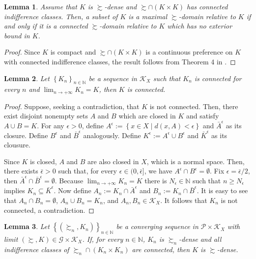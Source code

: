 \documentclass[12pt, oneside]{amsart}
\newtheorem{lemma}{Lemma}
\theoremstyle{definition}
\begin{document}
\begin{lemma}
\label{lm:maxdomain_fullchar}
Assume that $K$ is $\succsim$-dense and $\succsim \cap \left(K\times K\right)$ has connected indifference classes. Then, a subset of $K$ is a maximal $\succsim$-domain relative to $K$ if and only if it is a connected $\succsim$-domain relative to $K$ which has no exterior bound in $K$.
\end{lemma}
	
\begin{proof}
Since $K$ is compact and $\succsim \cap \left(K\times K\right)$ is a continuous preference on $K$ with connected indifference classes, the result follows from Theorem 4 in \citet*{GornoRivello2020}.
\end{proof}
	
	
\begin{lemma}
\label{lm:conv_connectset}
Let $\left\{K_n\right\}_{n \in \mathbb{N}}$ be a sequence in $\mathcal{K}_X$ such that $K_n$ is connected for every $n$ and $\lim_{n \to +\infty} K_n = K$, then $K$ is connected.
\end{lemma}
	
\begin{proof}
Suppose, seeking a contradiction, that $K$ is not connected. Then, there exist disjoint nonempty sets $A$ and $B$ which are closed in $K$ and satisfy $A \cup B = K$. For any $\epsilon > 0$, define $A^{\epsilon} := \left\{ x \in X \middle| d(x, A) < \epsilon \right\}$ and $\bar{A}^{\epsilon}$ as its closure. Define $B^{\epsilon}$ and $\bar{B}^{\epsilon}$ analogously. Define $K^{\epsilon} := A^{\epsilon} \cup B^{\epsilon}$ and $\bar{K}^{\epsilon}$ as its clousure.
		
Since $K$ is closed, $A$ and $B$ are also closed in $X$, which is a normal space. Then, there exists $\bar{\epsilon} > 0$ such that, for every $\epsilon \in (0, \bar{\epsilon}]$, we have $A^{\epsilon} \cap B^{\epsilon} = \emptyset$. Fix $\epsilon = \bar{\epsilon}/2$, then $\bar{A}^{\epsilon} \cap \bar{B}^{\epsilon} = \emptyset$. Because $\lim_{n \to +\infty} K_n = K$ there is $N_{\epsilon} \in \mathbb{N}$ such that $n \ge N_{\epsilon}$ implies $K_n \subseteq \bar{K}^{\epsilon}$. Now define $A_n := K_n \cap \bar{A}^{\epsilon}$ and $B_n := K_n \cap \bar{B}^{\epsilon}$. It is easy to see that $A_n \cap B_n = \emptyset$, $A_n \cup B_n = K_n$, and $A_n, B_n \in \mathcal{K}_X$. It follows that $K_n$ is not connected, a contradiction.
\end{proof}
	
	
\begin{lemma}
\label{lm:pref_connectset}
Let $\left\{\left(\succsim_n, K_n\right)\right\}_{n \in \mathbb{N}}$ be a converging sequence in $\mathcal{P} \times \mathcal{K}_X$ with limit $(\succsim, K) \in \mathcal{G} \times \mathcal{K}_X$. If, for every $n \in \mathbb{N}$, $K_n$ is $\succsim_n$-dense and all indifference classes of $\succsim_n \cap \left(K_n \times K_n\right)$ are connected, then $K$ is $\succsim$-dense.
\end{lemma}
	
\end{document}
